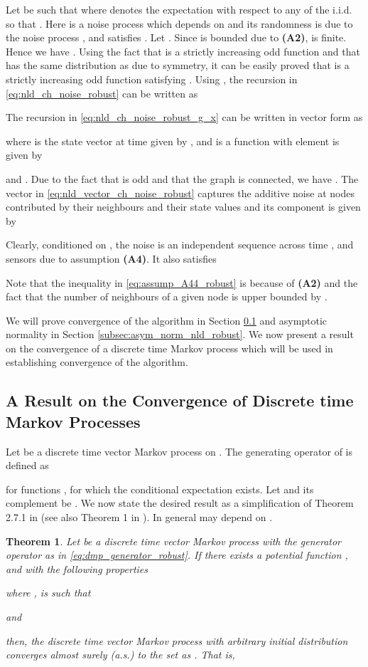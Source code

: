\documentclass[onecolumn, draft, 12pt]{IEEEtran}
\newtheorem{thm}{Theorem}
\begin{document}
Let  be such that  where  denotes the expectation with respect to any of the i.i.d.  so that . Here  is a noise process which depends on  and its randomness is due to the noise process , and satisfies . Let . Since  is bounded due to \textbf{(A2)},  is finite. Hence we have . Using the fact that  is a strictly increasing odd function and that  has the same distribution as  due to symmetry, it can be easily proved that  is a strictly increasing odd function satisfying . Using , the recursion in \eqref{eq:nld_ch_noise_robust} can be written as


The recursion in \eqref{eq:nld_ch_noise_robust_g_x} can be written in vector form as

where  is the state vector at time  given by , and  is a function with  element is given by

and . Due to the fact that  is odd and that the graph is connected, we have . The vector  in \eqref{eq:nld_vector_ch_noise_robust} captures the additive noise at  nodes contributed by their neighbours and their state values and its  component is given by

Clearly, conditioned on , the noise  is an independent sequence across time , and sensors  due to assumption \textbf{(A4)}. It also satisfies

Note that the inequality in \eqref{eq:assump_A44_robust} is because of \textbf{(A2)} and the fact that the number of neighbours of a given node is upper bounded by .

We will prove convergence of the  algorithm in Section \ref{subsec:conv_res_dmp_robust} and asymptotic normality in Section \ref{subsec:asym_norm_nld_robust}. We now present a result on the convergence of a discrete time Markov process which will be used in establishing convergence of the  algorithm. 

\subsection{A Result on the Convergence of Discrete time Markov Processes}\label{subsec:conv_res_dmp_robust}
Let  be a discrete time vector Markov process on . The generating operator  of  is defined as

for functions , for which the conditional expectation exists. Let  and its complement be . We now state the desired result as a simplification of Theorem 2.7.1 in \cite{Nevelson1973} (see also Theorem 1 in \cite{KarMoura2009}). In general  may depend on . 

\begin{thm} \label{nld_conv_dmp_res_thm_robust}
Let  be a discrete time vector Markov process with the generator operator  as in \eqref{eq:dmp_generator_robust}. If there exists a potential function , and  with the following properties


where ,  is such that

and

then, the discrete time vector Markov process  with arbitrary initial distribution converges almost surely (a.s.) to the set  as . That is,


\end{thm}
\end{document}
